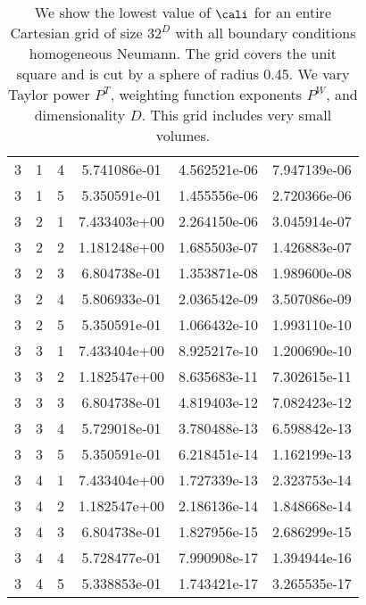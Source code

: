 \documentclass{article}
\begin{document}
{\begin{small}
\begin{table}
\begin{center}
\begin{tabular}{|ccc|ccc|}
3 & 1 & 4 &  5.741086e-01 & 4.562521e-06 & 7.947139e-06 \\ 
3 & 1 & 5 &  5.350591e-01 & 1.455556e-06 & 2.720366e-06 \\ 
3 & 2 & 1 &  7.433403e+00 & 2.264150e-06 & 3.045914e-07 \\ 
3 & 2 & 2 &  1.181248e+00 & 1.685503e-07 & 1.426883e-07 \\ 
3 & 2 & 3 &  6.804738e-01 & 1.353871e-08 & 1.989600e-08 \\ 
3 & 2 & 4 &  5.806933e-01 & 2.036542e-09 & 3.507086e-09 \\ 
3 & 2 & 5 &  5.350591e-01 & 1.066432e-10 & 1.993110e-10 \\ 
3 & 3 & 1 &  7.433404e+00 & 8.925217e-10 & 1.200690e-10 \\ 
3 & 3 & 2 &  1.182547e+00 & 8.635683e-11 & 7.302615e-11 \\ 
3 & 3 & 3 &  6.804738e-01 & 4.819403e-12 & 7.082423e-12 \\ 
3 & 3 & 4 &  5.729018e-01 & 3.780488e-13 & 6.598842e-13 \\ 
3 & 3 & 5 &  5.350591e-01 & 6.218451e-14 & 1.162199e-13 \\ 
3 & 4 & 1 &  7.433404e+00 & 1.727339e-13 & 2.323753e-14 \\ 
3 & 4 & 2 &  1.182547e+00 & 2.186136e-14 & 1.848668e-14 \\ 
3 & 4 & 3 &  6.804738e-01 & 1.827956e-15 & 2.686299e-15 \\ 
3 & 4 & 4 &  5.728477e-01 & 7.990908e-17 & 1.394944e-16 \\ 
3 & 4 & 5 &  5.338853e-01 & 1.743421e-17 & 3.265535e-17 \\ 
\hline
\end{tabular}
\end{center}
\label{fig::unmergedSolvability}
\caption
    {
      We show the lowest value of
      $\cali$ for an entire Cartesian grid of size $32^D$ with all
      boundary conditions homogeneous Neumann.
      The grid covers the unit square and is cut by a sphere of radius 0.45.
      We vary Taylor power $P^T$, weighting
      function exponents $P^W$, and dimensionality $D$.    This grid
      includes very small volumes.
    }
\end{table}
\end{small}


}
\end{document}
